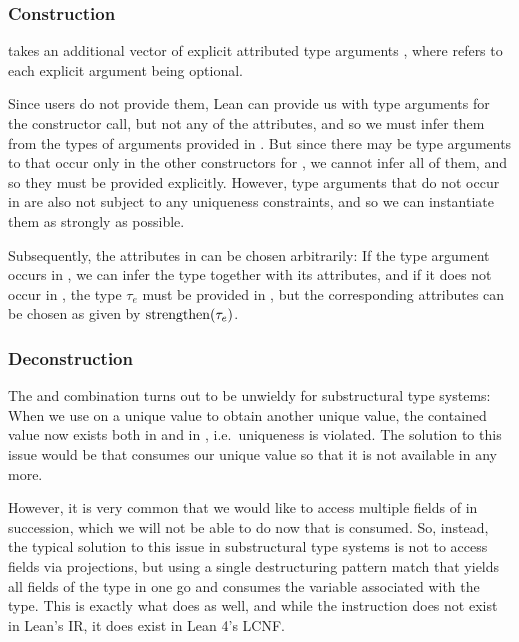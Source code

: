 \subsubsection{Construction}
 takes an additional vector of explicit attributed type arguments \icode{[τ?]}, where  refers to each explicit argument being optional. 

Since users do not provide them, Lean can provide us with type arguments \icode{[κ]} for the constructor call, but not any of the attributes, and so we must infer them from the types of arguments provided in \icode{[y]}. But since there may be type arguments to  that occur only in the other constructors for , we cannot infer all of them, and so they must be provided explicitly. However, type arguments that do not occur in \icode{[y]} are also not subject to any uniqueness constraints, and so we can instantiate them as strongly as possible. 

Subsequently, the attributes in \icode{[τ?]} can be chosen arbitrarily: If the type argument occurs in \icode{[y]}, we can infer the type together with its attributes, and if it does not occur in \icode{[y]}, the type $\tau_e$ must be provided in \icode{[τ?]}, but the corresponding attributes can be chosen as given by $\mathrm{strengthen}(\tau_e)$.

\subsubsection{Deconstruction}
The  and  combination turns out to be unwieldy for substructural type systems: When we use  on a unique value to obtain another unique value, the contained value now exists both in  and in , i.e.\ uniqueness is violated. The solution to this issue would be that  consumes our unique value  so that it is not available in  any more. 

However, it is very common that we would like to access multiple fields of  in succession, which we will not be able to do now that  is consumed. So, instead, the typical solution to this issue in substructural type systems is not to access fields via projections, but using a single destructuring pattern match that yields all fields of the type in one go and consumes the variable associated with the type. This is exactly what  does as well, and while the instruction does not exist in Lean's IR, it does exist in Lean 4's LCNF. 

